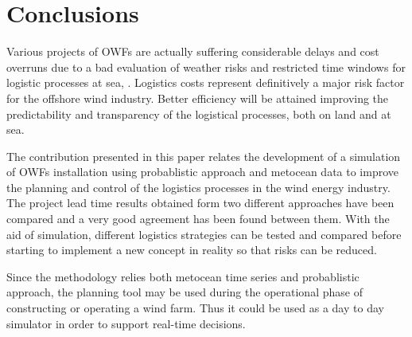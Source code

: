 \section{Conclusions}
\label{conclusions}
Various projects of OWFs are actually suffering considerable delays and cost overruns due to a bad evaluation of weather risks and restricted time windows for logistic processes at sea, \cite{TCE12, ISOPE2013}. Logistics costs represent definitively a major risk factor for the offshore wind industry. Better efficiency will be attained improving the predictability and transparency of the logistical processes, both on land and at sea.

The contribution presented in this paper relates the development of a simulation of OWFs installation using probablistic approach and metocean data to improve the planning and control of the logistics processes in the wind energy industry. The project lead time results obtained form two different approaches have been compared and a very good agreement has been found between them. With the aid of simulation, different logistics strategies can be tested and compared before starting to implement a new concept in reality so that risks can be reduced.

Since the methodology relies both metocean time series and probablistic approach, the planning tool may be used during the operational phase of constructing or operating a wind farm. Thus it could be used as a day to day simulator in order to support real-time decisions.
